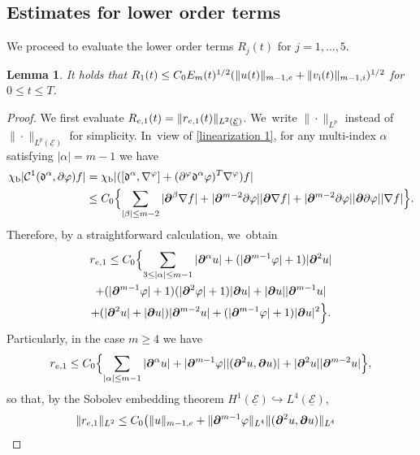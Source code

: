 \documentclass[11pt]{article}
\newcommand{\cE}{{\mathcal E}}
\newcommand{\ul}[1]{\underline{#1}}
\newtheorem{lemma}[theorem]{Lemma}
\theoremstyle{definition}
\begin{document}
\subsection{Estimates for lower order terms}\label{sectestLOT}
We proceed to evaluate the lower order terms $R_j(t)$ for $j=1,\ldots,5$.

\begin{lemma}\label{lem:EstR1}
It holds that $R_1(t) \leq C_0E_m(t)^{1/2}(\|u(t)\|_{m-1,{\rm e}}+\|v_\mathrm{i}(t)\|_{m-1,{\rm i}})^{1/2}$ for $0\leq t\leq T$.
\end{lemma}

\begin{proof}
We first evaluate $R_{{\rm e},1}(t)=\|r_{{\rm e},1}(t)\|_{L^2(\ul{\cE})}$. We~write $\|\cdot\|_{L^p}$ instead of $\|\cdot\|_{L^p(\ul{\cE})}$ for simplicity. In~view of \eqref{linearization 1}, for any multi-index $\alpha$ satisfying $|\alpha|=m-1$ we have
\begin{align*}
\chi_\mathrm{b}|{\mathcal C}^1(\mathfrak{d}^\alpha,\partial \varphi)f|
&= \chi_\mathrm{b}|([\mathfrak{d}^\alpha,\nabla^\varphi]+(\partial^\varphi\mathfrak{d}^\alpha\varphi)^{\rm T}\nabla^\varphi)f| \\
&\leq C_0 \Bigl\{ \sum_{|\beta|\leq m-2}|\bm{\partial}^\beta\nabla f| + |\bm{\partial}^{m-2}\partial\varphi||\bm{\partial}\nabla f|
+ |\bm{\partial}^{m-2}\partial\varphi||\bm{\partial}\partial\varphi||\nabla f| \Bigr\}.
\end{align*}
Therefore, by a straightforward calculation, we~obtain
\begin{multline*}
r_{{\rm e},1}
\leq C_0\Bigl\{ \sum_{3\leq|\alpha|\leq m-1}|\bm{\partial}^\alpha u| + (|\bm{\partial}^{m-1}\varphi|+1)|\bm{\partial}^2u| \\
+ (|\bm{\partial}^{m-1}\varphi|+1)(|\bm{\partial}^2\varphi|+1)|\bm{\partial}u| + |\bm{\partial}u||\bm{\partial}^{m-1}u| \\
+ (|\bm{\partial}^2u|+|\bm{\partial}u|)|\bm{\partial}^{m-2}u| + (|\bm{\partial}^{m-1}\varphi|+1)|\bm{\partial}u|^2 \Bigr\}.
\end{multline*}
Particularly, in the case $m\geq 4$ we have
\[
r_{{\rm e},1}
\leq C_0 \Bigl\{ \sum_{|\alpha|\leq m-1}|\bm{\partial}^\alpha u| + |\bm{\partial}^{m-1}\varphi||(\bm{\partial}^2u,\bm{\partial}u)|
+ |\bm{\partial}^2u||\bm{\partial}^{m-2}u| \Bigr\},
\]
so that, by the Sobolev embedding theorem $H^1(\ul{\cE}) \hookrightarrow L^4(\ul{\cE})$,
\begin{align*}
\|r_{{\rm e},1}\|_{L^2}
&\leq C_0 \bigl(\|u\|_{m-1,{\rm e}} + \|\bm{\partial}^{m-1}\varphi\|_{L^4}\|(\bm{\partial}^2u,\bm{\partial}u)\|_{L^4}

\end{align*}
\end{proof}
\end{document}
